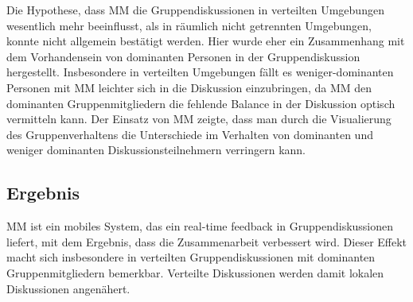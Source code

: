 Die Hypothese, dass MM die Gruppendiskussionen in verteilten Umgebungen
wesentlich mehr beeinflusst, als in räumlich nicht getrennten Umgebungen, konnte
nicht allgemein bestätigt werden. Hier wurde eher ein Zusammenhang mit dem
Vorhandensein von dominanten Personen in der Gruppendiskussion hergestellt.
Insbesondere in verteilten Umgebungen fällt es weniger-dominanten Personen mit
MM leichter sich in die Diskussion einzubringen, da MM den dominanten
Gruppenmitgliedern die fehlende Balance in der Diskussion optisch vermitteln
kann. 
Der Einsatz von MM zeigte, dass man durch die Visualierung des Gruppenverhaltens
die Unterschiede im Verhalten von dominanten und weniger dominanten
Diskussionsteilnehmern verringern kann.

\subsection{Ergebnis}
MM ist ein mobiles System, das ein real-time feedback in Gruppendiskussionen
liefert, mit dem Ergebnis, dass die Zusammenarbeit verbessert wird.
Dieser Effekt macht sich insbesondere in verteilten Gruppendiskussionen mit
dominanten Gruppenmitgliedern bemerkbar. Verteilte Diskussionen werden damit
lokalen Diskussionen angenähert.


